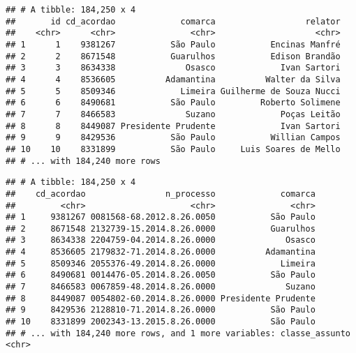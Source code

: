 \documentclass[]{book}
\newenvironment{Shaded}{\begin{snugshade}}{\end{snugshade}}
\newcommand{\KeywordTok}[1]{\textcolor[rgb]{0.13,0.29,0.53}{\textbf{{#1}}}}
\newcommand{\DataTypeTok}[1]{\textcolor[rgb]{0.13,0.29,0.53}{{#1}}}
\newcommand{\StringTok}[1]{\textcolor[rgb]{0.31,0.60,0.02}{{#1}}}
\newcommand{\NormalTok}[1]{{#1}}
\begin{document}
\begin{Shaded}
\end{Shaded}

\begin{verbatim}
## # A tibble: 184,250 x 4
##       id cd_acordao             comarca                  relator
##    <chr>      <chr>               <chr>                    <chr>
## 1      1    9381267           São Paulo           Encinas Manfré
## 2      2    8671548           Guarulhos           Edison Brandão
## 3      3    8634338              Osasco             Ivan Sartori
## 4      4    8536605          Adamantina          Walter da Silva
## 5      5    8509346             Limeira Guilherme de Souza Nucci
## 6      6    8490681           São Paulo         Roberto Solimene
## 7      7    8466583              Suzano             Poças Leitão
## 8      8    8449087 Presidente Prudente             Ivan Sartori
## 9      9    8429536           São Paulo           Willian Campos
## 10    10    8331899           São Paulo     Luis Soares de Mello
## # ... with 184,240 more rows
\end{verbatim}

\begin{Shaded}
\end{Shaded}

\begin{verbatim}
## # A tibble: 184,250 x 4
##    cd_acordao                n_processo             comarca
##         <chr>                     <chr>               <chr>
## 1     9381267 0081568-68.2012.8.26.0050           São Paulo
## 2     8671548 2132739-15.2014.8.26.0000           Guarulhos
## 3     8634338 2204759-04.2014.8.26.0000              Osasco
## 4     8536605 2179832-71.2014.8.26.0000          Adamantina
## 5     8509346 2055376-49.2014.8.26.0000             Limeira
## 6     8490681 0014476-05.2014.8.26.0050           São Paulo
## 7     8466583 0067859-48.2014.8.26.0000              Suzano
## 8     8449087 0054802-60.2014.8.26.0000 Presidente Prudente
## 9     8429536 2128810-71.2014.8.26.0000           São Paulo
## 10    8331899 2002343-13.2015.8.26.0000           São Paulo
## # ... with 184,240 more rows, and 1 more variables: classe_assunto <chr>
\end{verbatim}
\end{document}
